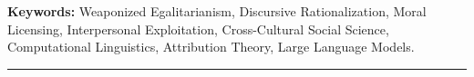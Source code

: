 \documentclass[11pt,a4paper]{article}
\begin{document}
\vspace{1ex}
\noindent \textbf{Keywords:} Weaponized Egalitarianism, Discursive Rationalization, Moral Licensing, Interpersonal Exploitation, Cross-Cultural Social Science, Computational Linguistics, Attribution Theory, Large Language Models.

\vspace{2ex}
\hrule
\vspace{2ex}







\clearpage


\end{document}
